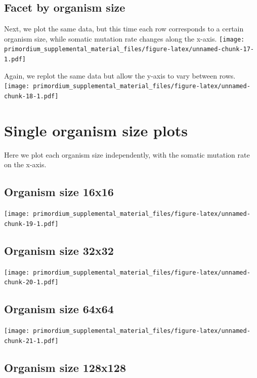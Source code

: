 \documentclass[
]{book}
\begin{document}
\hypertarget{facet-by-organism-size}{%
\subsection{Facet by organism size}\label{facet-by-organism-size}}

Next, we plot the same data, but this time each row corresponds to a certain organism size, while somatic mutation rate changes along the x-axis.
\texttt{[image: primordium\_supplemental\_material\_files/figure-latex/unnamed-chunk-17-1.pdf]}

Again, we replot the same data but allow the y-axis to vary between rows.
\texttt{[image: primordium\_supplemental\_material\_files/figure-latex/unnamed-chunk-18-1.pdf]}

\hypertarget{single-organism-size-plots}{%
\section{Single organism size plots}\label{single-organism-size-plots}}

Here we plot each organism size independently, with the somatic mutation rate on the x-axis.

\hypertarget{organism-size-16x16}{%
\subsection{Organism size 16x16}\label{organism-size-16x16}}

\texttt{[image: primordium\_supplemental\_material\_files/figure-latex/unnamed-chunk-19-1.pdf]}

\hypertarget{organism-size-32x32}{%
\subsection{Organism size 32x32}\label{organism-size-32x32}}

\texttt{[image: primordium\_supplemental\_material\_files/figure-latex/unnamed-chunk-20-1.pdf]}

\hypertarget{organism-size-64x64}{%
\subsection{Organism size 64x64}\label{organism-size-64x64}}

\texttt{[image: primordium\_supplemental\_material\_files/figure-latex/unnamed-chunk-21-1.pdf]}

\hypertarget{organism-size-128x128}{%
\subsection{Organism size 128x128}\label{organism-size-128x128}}
\end{document}
